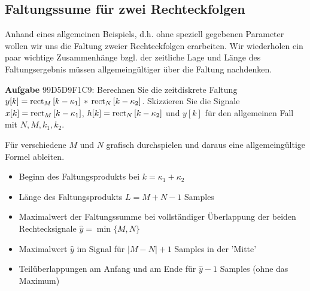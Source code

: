 \subsection{Faltungssume für zwei Rechteckfolgen}
\label{sec:99D5D9F1C9}
\begin{Ziel}
Anhand eines allgemeinen Beispiels, d.h. ohne speziell gegebenen Parameter
wollen wir uns die Faltung zweier Rechteckfolgen erarbeiten.
Wir wiederholen ein paar wichtige Zusammenhänge bzgl. der zeitliche Lage und
Länge des Faltungsergebnis müssen allgemeingültiger über die Faltung nachdenken.
\end{Ziel}
\textbf{Aufgabe} {\tiny 99D5D9F1C9}: Berechnen Sie die zeitdiskrete Faltung
$y[k] = \operatorname{\text{rect}}_{M} \left[ k-\kappa_1 \right] \, \ast \,\operatorname{\text{rect}}_{N} \left[ k-\kappa_2 \right]$.
Skizzieren Sie die Signale $x[k]=\operatorname{\text{rect}}_{M} \left[ k-\kappa_1 \right]$,
$h[k] = \operatorname{\text{rect}}_{N} \left[ k-\kappa_2 \right]$ und $y[k]$ für den allgemeinen Fall mit
$N,M, k_1, k_2$.
%
\begin{Ansatz}
Für verschiedene $M$ und $N$ grafisch durchspielen und
daraus eine allgemeingültige Formel ableiten.
\end{Ansatz}
%
\begin{ExCalc}
\begin{itemize}
\item Beginn des Faltungsprodukts bei $k=\kappa_1+\kappa_2$
\item Länge des Faltungsprodukts $L=M+N-1$ Samples
\item Maximalwert der Faltungssumme bei vollständiger Überlappung der beiden Rechtecksignale $\hat{y} = \min\{M,N\}$
\item Maximalwert $\hat{y}$ im Signal für $|M-N|+1$ Samples in der 'Mitte'
\item Teilüberlappungen am Anfang und am Ende für $\hat{y}-1$ Samples (ohne das Maximum)
\end{itemize}
\end{ExCalc}
